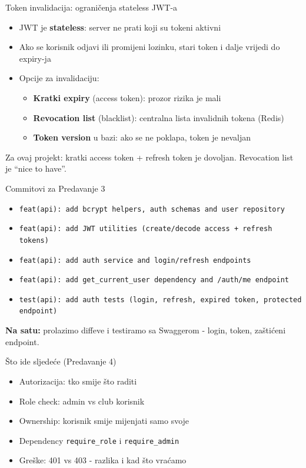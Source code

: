 \begin{frame}{Token invalidacija: ograničenja stateless JWT-a}
	\begin{itemize}
		\item JWT je \textbf{stateless}: server ne prati koji su tokeni aktivni
		\item Ako se korisnik odjavi ili promijeni lozinku, stari token i dalje vrijedi do expiry-ja
		\item Opcije za invalidaciju:
		\begin{itemize}
			\item \textbf{Kratki expiry} (access token): prozor rizika je mali
			\item \textbf{Revocation list} (blacklist): centralna lista invalidnih tokena (Redis)
			\item \textbf{Token version} u bazi: ako se ne poklapa, token je nevaljan
		\end{itemize}
	\end{itemize}

	\vspace{0.6em}
	Za ovaj projekt: kratki access token + refresh token je dovoljan. Revocation list je \enquote{nice to have}.
\end{frame}

\begin{frame}{Commitovi za Predavanje 3}
\begin{itemize}
  \item \texttt{feat(api): add bcrypt helpers, auth schemas and user repository}
  \item \texttt{feat(api): add JWT utilities (create/decode access + refresh tokens)}
  \item \texttt{feat(api): add auth service and login/refresh endpoints}
  \item \texttt{feat(api): add get\_current\_user dependency and /auth/me endpoint}
  \item \texttt{test(api): add auth tests (login, refresh, expired token, protected endpoint)}
\end{itemize}

\vspace{0.6em}
\textbf{Na satu:} prolazimo diffeve i testiramo sa Swaggerom - login, token, zaštićeni endpoint.
\end{frame}

\begin{frame}{Što ide sljedeće (Predavanje 4)}
	\begin{itemize}
		\item Autorizacija: tko smije što raditi
		\item Role check: admin vs club korisnik
		\item Ownership: korisnik smije mijenjati samo svoje
		\item Dependency \texttt{require\_role} i \texttt{require\_admin}
		\item Greške: 401 vs 403 - razlika i kad što vraćamo
	\end{itemize}
\end{frame}


